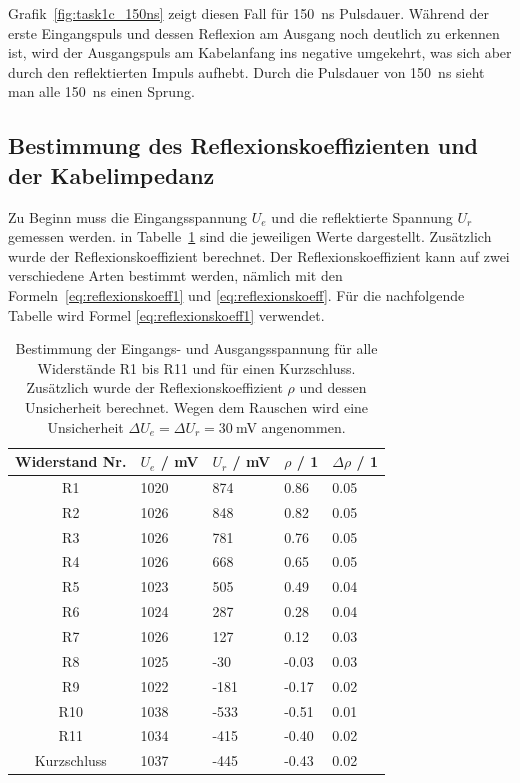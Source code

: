 \documentclass{article}
\begin{document}
Grafik~\ref{fig:task1c_150ns} zeigt diesen Fall für 150~ns Pulsdauer. Während der erste Eingangspuls und dessen Reflexion am Ausgang noch deutlich zu erkennen ist, wird der Ausgangspuls am Kabelanfang ins negative umgekehrt, was sich aber durch den reflektierten Impuls aufhebt. Durch die Pulsdauer von 150~ns sieht man alle 150~ns einen Sprung.

\subsection{Bestimmung des Reflexionskoeffizienten und der Kabelimpedanz}

Zu Beginn muss die Eingangsspannung $U_e$ und die reflektierte Spannung $U_r$ gemessen werden. in Tabelle~\ref{tab:reflexionskoeff} sind die jeweiligen Werte dargestellt. Zusätzlich wurde der Reflexionskoeffizient berechnet. Der Reflexionskoeffizient kann auf zwei verschiedene Arten bestimmt werden, nämlich mit den Formeln~\eqref{eq:reflexionskoeff1} und \eqref{eq:reflexionskoeff}. Für die nachfolgende Tabelle wird Formel \eqref{eq:reflexionskoeff1} verwendet.

\begin{table}[H]
\centering
\caption{Bestimmung der Eingangs- und Ausgangsspannung für alle Widerstände R1 bis R11 und für einen Kurzschluss. Zusätzlich wurde der Reflexionskoeffizient $\rho$ und dessen Unsicherheit berechnet. Wegen dem Rauschen wird eine Unsicherheit $\Delta U_e = \Delta U_r = 30~$mV angenommen.}
\label{tab:reflexionskoeff}
\begin{tabular}{c|llll}
Widerstand Nr. & $U_e$ / mV & $U_r$ / mV & $\rho$ / 1 & $\Delta \rho$ / 1 \\
\hline
R1 & 1020 & 874 & 0.86 & 0.05 \\
R2 & 1026 & 848 & 0.82 & 0.05 \\
R3 & 1026 & 781 & 0.76 & 0.05 \\
R4 & 1026 & 668 & 0.65 & 0.05 \\
R5 & 1023 & 505 & 0.49 & 0.04 \\
R6 & 1024 & 287 & 0.28 & 0.04 \\
R7 & 1026 & 127 & 0.12 & 0.03 \\
R8 & 1025 & -30 & -0.03 & 0.03 \\
R9 & 1022 & -181 & -0.17 & 0.02 \\
R10 & 1038 & -533 & -0.51 & 0.01\\
R11 & 1034 & -415 & -0.40 & 0.02 \\
Kurzschluss & 1037 & -445 & -0.43 & 0.02
\end{tabular}
\end{table}
\end{document}
